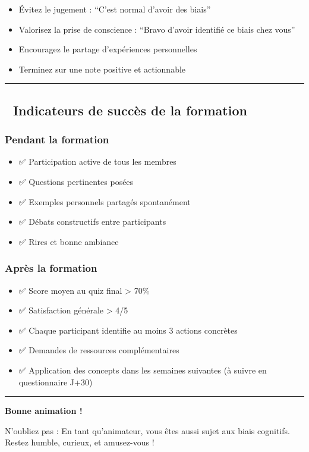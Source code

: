 \documentclass[
]{article}
\providecommand{\tightlist}{%
  \setlength{\itemsep}{0pt}\setlength{\parskip}{0pt}}
\begin{document}
\begin{itemize}
\tightlist
\item
  Évitez le jugement : ``C'est normal d'avoir des biais''
\item
  Valorisez la prise de conscience : ``Bravo d'avoir identifié ce biais
  chez vous''
\item
  Encouragez le partage d'expériences personnelles
\item
  Terminez sur une note positive et actionnable
\end{itemize}

\begin{center}\rule{0.5\linewidth}{0.5pt}\end{center}

\subsection{🎯 Indicateurs de succès de la
formation}\label{indicateurs-de-succuxe8s-de-la-formation}

\subsubsection{Pendant la formation}\label{pendant-la-formation}

\begin{itemize}
\tightlist
\item
  ✅ Participation active de tous les membres
\item
  ✅ Questions pertinentes posées
\item
  ✅ Exemples personnels partagés spontanément
\item
  ✅ Débats constructifs entre participants
\item
  ✅ Rires et bonne ambiance
\end{itemize}

\subsubsection{Après la formation}\label{apruxe8s-la-formation}

\begin{itemize}
\tightlist
\item
  ✅ Score moyen au quiz final \textgreater{} 70\%
\item
  ✅ Satisfaction générale \textgreater{} 4/5
\item
  ✅ Chaque participant identifie au moins 3 actions concrètes
\item
  ✅ Demandes de ressources complémentaires
\item
  ✅ Application des concepts dans les semaines suivantes (à suivre en
  questionnaire J+30)
\end{itemize}

\begin{center}\rule{0.5\linewidth}{0.5pt}\end{center}

\textbf{Bonne animation ! 🎉}

N'oubliez pas : En tant qu'animateur, vous êtes aussi sujet aux biais
cognitifs. Restez humble, curieux, et amusez-vous !
\end{document}
